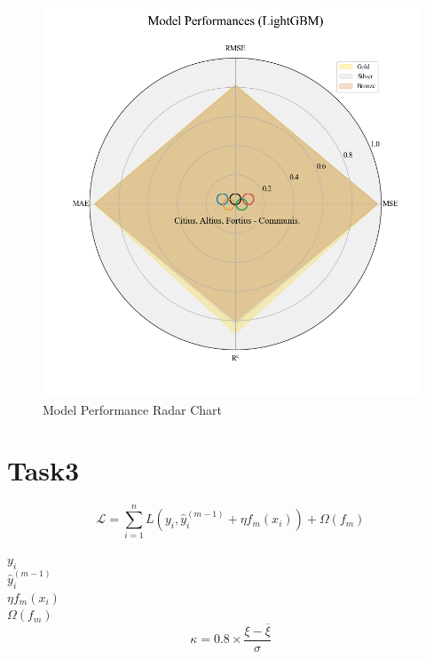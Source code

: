 \documentclass[12pt]{article}  %
\begin{document}
\begin{figure}[htbp]
	\centering
	\includegraphics[width=16cm]{img/Performance.png}
	\caption{Model Performance Radar Chart}
	\label{fig:aa}
\end{figure}








\section{Task3}


\begin{equation}
	\mathcal{L} = \sum_{i=1}^{n} L(y_i, \hat{y}_i^{(m-1)} + \eta f_m(x_i)) + \Omega(f_m)
\end{equation}

$y_i$\\
$\hat{y}_i^{(m-1)}$\\
$\eta f_m(x_i)$\\
$\Omega(f_m)$\\




\begin{equation}
	\kappa = 0.8 \times \frac{\xi - \overline{\xi}}{\sigma}
\end{equation}
\end{document}
